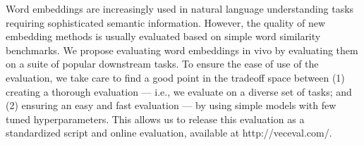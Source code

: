 Word embeddings are increasingly used in natural language understanding tasks requiring sophisticated semantic information. However, the quality of new embedding methods is usually evaluated based on simple word similarity benchmarks. We propose evaluating word embeddings in vivo by evaluating them on a suite of popular downstream tasks. To ensure the ease of use of the evaluation, we take care to find a good point in the tradeoff space between (1) creating a thorough evaluation --- i.e., we evaluate on a diverse set of tasks; and (2) ensuring an easy and fast evaluation --- by using simple models with few tuned hyperparameters. This allows us to release this evaluation as a standardized script and online evaluation, available at http://veceval.com/.
